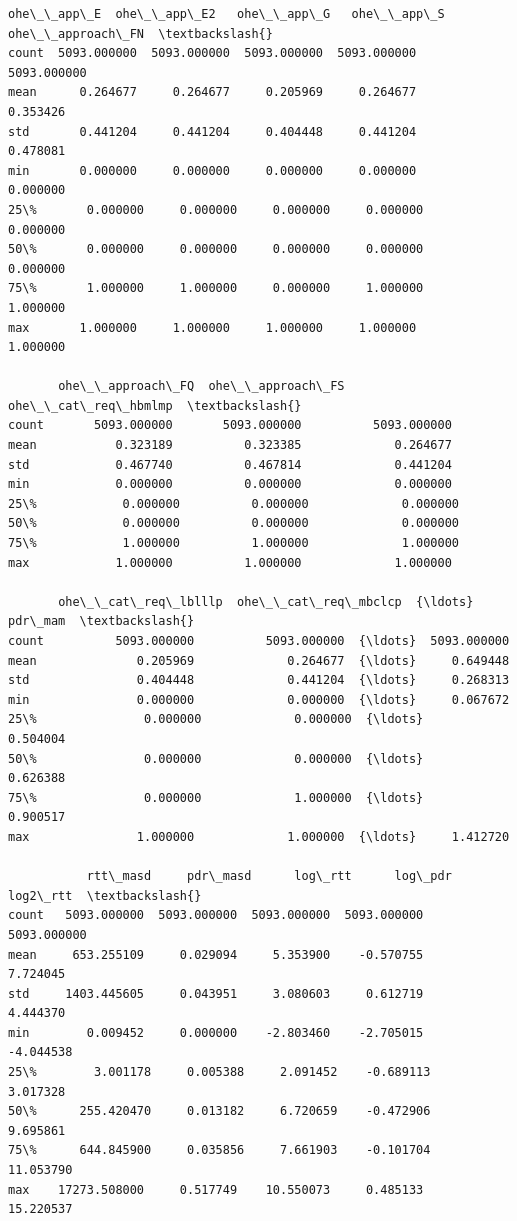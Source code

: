 \documentclass[11pt]{article}
\makeatletter
\newcommand{\boxspacing}{\kern\kvtcb@left@rule\kern\kvtcb@boxsep}
\newcommand{\prompt}[4]{
        {\ttfamily\llap{{\color{#2}[#3]:\hspace{3pt}#4}}\vspace{-\baselineskip}}
    }
\makeatother
\begin{document}
            \begin{tcolorbox}[breakable, size=fbox, boxrule=.5pt, pad at break*=1mm, opacityfill=0]
\prompt{Out}{outcolor}{28}{\boxspacing}
\begin{Verbatim}[commandchars=\\\{\}]
        ohe\_\_app\_E  ohe\_\_app\_E2   ohe\_\_app\_G   ohe\_\_app\_S  ohe\_\_approach\_FN  \textbackslash{}
count  5093.000000  5093.000000  5093.000000  5093.000000       5093.000000
mean      0.264677     0.264677     0.205969     0.264677          0.353426
std       0.441204     0.441204     0.404448     0.441204          0.478081
min       0.000000     0.000000     0.000000     0.000000          0.000000
25\%       0.000000     0.000000     0.000000     0.000000          0.000000
50\%       0.000000     0.000000     0.000000     0.000000          0.000000
75\%       1.000000     1.000000     0.000000     1.000000          1.000000
max       1.000000     1.000000     1.000000     1.000000          1.000000

       ohe\_\_approach\_FQ  ohe\_\_approach\_FS  ohe\_\_cat\_req\_hbmlmp  \textbackslash{}
count       5093.000000       5093.000000          5093.000000
mean           0.323189          0.323385             0.264677
std            0.467740          0.467814             0.441204
min            0.000000          0.000000             0.000000
25\%            0.000000          0.000000             0.000000
50\%            0.000000          0.000000             0.000000
75\%            1.000000          1.000000             1.000000
max            1.000000          1.000000             1.000000

       ohe\_\_cat\_req\_lblllp  ohe\_\_cat\_req\_mbclcp  {\ldots}      pdr\_mam  \textbackslash{}
count          5093.000000          5093.000000  {\ldots}  5093.000000
mean              0.205969             0.264677  {\ldots}     0.649448
std               0.404448             0.441204  {\ldots}     0.268313
min               0.000000             0.000000  {\ldots}     0.067672
25\%               0.000000             0.000000  {\ldots}     0.504004
50\%               0.000000             0.000000  {\ldots}     0.626388
75\%               0.000000             1.000000  {\ldots}     0.900517
max               1.000000             1.000000  {\ldots}     1.412720

           rtt\_masd     pdr\_masd      log\_rtt      log\_pdr     log2\_rtt  \textbackslash{}
count   5093.000000  5093.000000  5093.000000  5093.000000  5093.000000
mean     653.255109     0.029094     5.353900    -0.570755     7.724045
std     1403.445605     0.043951     3.080603     0.612719     4.444370
min        0.009452     0.000000    -2.803460    -2.705015    -4.044538
25\%        3.001178     0.005388     2.091452    -0.689113     3.017328
50\%      255.420470     0.013182     6.720659    -0.472906     9.695861
75\%      644.845900     0.035856     7.661903    -0.101704    11.053790
max    17273.508000     0.517749    10.550073     0.485133    15.220537


\end{Verbatim}
\end{tcolorbox}
\end{document}
